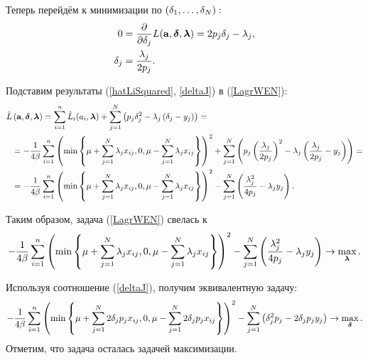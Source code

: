 Теперь перейдём к минимизации по $\left(\delta_1, \ldots, \delta_N\right):$
\begin{align}
	\notag
	0 &= \frac{\partial}{\partial\delta_j}L(\boldsymbol{\mathbf{a}},\boldsymbol{\mathbf{\delta}}, \boldsymbol{\mathbf{\lambda}}) = 2p_j\delta_j - \lambda_j, \\
	\label{deltaJ}
	\delta_j &= \frac{\lambda_j}{2p_j}.
\end{align}

Подставим результаты (\ref{hatLiSquared}, \ref{deltaJ}) в (\ref{LagrWEN}):
\begin{align*} 
	\hat L&\left(\boldsymbol{\mathbf{a}},\boldsymbol{\mathbf{\delta}}, \boldsymbol{\mathbf{\lambda}}\right) 
		= \sum\limits_{i=1}^n \hat L_i(a_i,\boldsymbol{\mathbf{\lambda}})
		+ \sum\limits_{j=1}^N \left(p_j\delta_j^2  - \lambda_j\left(\delta_j - y_j\right)\right) = \\
		&= -\frac1{4\beta} \sum\limits_{i=1}^n \left(\mathop{\mbox{min}}\limits\left\{\mu + \sum\limits_{j=1}^N\lambda_jx_{ij}, 0, \mu-\sum\limits_{j=1}^N\lambda_jx_{ij}\right\}\right)^2
		+ \sum\limits_{j=1}^N \left(p_j\left(\frac{\lambda_j}{2p_j}\right)^2  - \lambda_j\left(\frac{\lambda_j}{2p_j} - y_j\right)\right) = \\
		&= -\frac1{4\beta} \sum\limits_{i=1}^n \left(\mathop{\mbox{min}}\limits\left\{\mu + \sum\limits_{j=1}^N\lambda_jx_{ij}, 0, \mu - \sum\limits_{j=1}^N\lambda_jx_{ij}\right\}\right)^2
		- \sum\limits_{j=1}^N \left( \frac{\lambda_j^2}{4p_j}  - \lambda_j y_j\right).
\end{align*}

Таким образом, задача (\ref{LagrWEN}) свелась к 
\begin{align}
-\frac1{4\beta} \sum\limits_{i=1}^n \left(\mathop{\mbox{min}}\limits\left\{\mu + \sum\limits_{j=1}^N\lambda_jx_{ij}, 0, \mu - \sum\limits_{j=1}^N\lambda_jx_{ij}\right\}\right)^2
		- \sum\limits_{j=1}^N \left( \frac{\lambda_j^2}{4p_j}  - \lambda_j y_j\right) \to \mathop{\mbox{max}}\limits_{\boldsymbol{\mathbf{\lambda}}}.
\end{align}

Используя соотношение (\ref{deltaJ}), получим эквивалентную задачу:
\begin{align*} 
	-\frac1{4\beta} \sum\limits_{i=1}^n \left(\mathop{\mbox{min}}\limits\left\{\mu + \sum\limits_{j=1}^N2 \delta_j p_jx_{ij}, 0, \mu-\sum\limits_{j=1}^N2 \delta_j p_jx_{ij}\right\}\right)^2
		- \sum\limits_{j=1}^N \left( \delta_j^2 p_j  - 2\delta_j p_j y_j\right) \to \mathop{\mbox{max}}\limits_{\boldsymbol{\mathbf{\delta}}}.
\end{align*}
Отметим, что задача осталась задачей максимизации.

